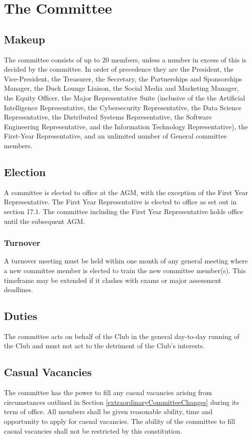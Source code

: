 \documentclass[11pt]{article}
\begin{document}
\section{The Committee} \label{theCommittee}
\subsection{Makeup} \label{committeeMakeup}
The committee consists of up to 20 members, unless a number in excess of this is decided by the committee. In order of precedence they are the President, the Vice-President, the Treasurer, the Secretary, the Partnerships and Sponsorships Manager, the Duck Lounge Liaison, the Social Media and Marketing Manager, the Equity Officer, the Major Representative Suite (inclusive of the the Artificial Intelligence Representative, the Cybersecurity Representative, the Data Science Representative, the Distributed Systems Representative, the Software Engineering Representative, and the Information Technology Representative), the First-Year Representative, and an unlimited number of General committee members.

\subsection{Election}
A committee is elected to office at the AGM, with the exception of the First Year Representative. The First Year Representative is elected to office as set out in section 17.1. The committee including the First Year Representative holds office until the subsequent AGM.
\subsubsection{Turnover}
A turnover meeting must be held within one month of any general meeting where a new committee member is elected to train the new committee member(s). This timeframe may be extended if it clashes with exams or major assessment deadlines.

\subsection{Duties}
The committee acts on behalf of the Club in the general day-to-day running of the Club and must not act to the detriment of the Club’s interests.

\subsection{Casual Vacancies} \label{committeeCasualVacancies}
The committee has the power to fill any casual vacancies arising from circumstances outlined in Section \ref{extraordinaryCommitteeChanges} during its term of office. All members shall be given reasonable ability, time and opportunity to apply for casual vacancies. The ability of the committee to fill casual vacancies shall not be restricted by this constitution.
\end{document}
